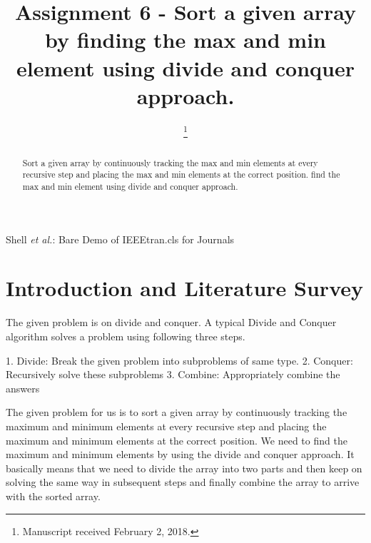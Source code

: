 \documentclass[conference]{IEEEtran}
\begin{document}
\title{Assignment 6 - Sort a given array by finding the max and min element using divide and conquer approach.}

\author{
\and
{}
\and
{}
\and
{}
\thanks{Manuscript received February 2, 2018.}}

{Shell \MakeLowercase{\textit{et al.}}: Bare Demo of IEEEtran.cls for Journals}

\maketitle

\IEEEpeerreviewmaketitle
\begin{abstract}
Sort a given array by continuously tracking the max and min elements at every recursive step and placing the max and min elements at the correct position. find the max and min element using divide and conquer approach. 
\end{abstract}

\section{\textbf{Introduction and Literature Survey}}

The given problem is on divide and conquer. A typical Divide and Conquer algorithm solves a problem using following three steps.

1. Divide: Break the given problem into subproblems of same type.
2. Conquer: Recursively solve these subproblems
3. Combine: Appropriately combine the answers


The given problem for us is to sort a given array by continuously tracking the maximum and minimum elements at every recursive step and placing the maximum and minimum elements at the correct position. We need to find the maximum and minimum elements by using the divide and conquer approach. It basically means that we need to divide the array into two parts and then keep on solving the same way in subsequent steps and finally combine the array to arrive with the sorted array.  
\end{document}
